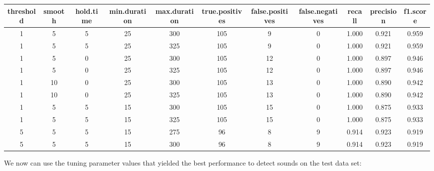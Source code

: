 \documentclass[
]{article}
\newenvironment{Shaded}{\begin{snugshade}}{\end{snugshade}}
\newcommand{\AttributeTok}[1]{\textcolor[rgb]{0.77,0.63,0.00}{#1}}
\newcommand{\DecValTok}[1]{\textcolor[rgb]{0.00,0.00,0.81}{#1}}
\newcommand{\FloatTok}[1]{\textcolor[rgb]{0.00,0.00,0.81}{#1}}
\newcommand{\FunctionTok}[1]{\textcolor[rgb]{0.00,0.00,0.00}{#1}}
\newcommand{\NormalTok}[1]{#1}
\newcommand{\OtherTok}[1]{\textcolor[rgb]{0.56,0.35,0.01}{#1}}
\newcommand{\SpecialCharTok}[1]{\textcolor[rgb]{0.00,0.00,0.00}{#1}}
\begin{document}
\begin{table}
\centering
\begin{tabular}[t]{c|c|c|c|c|c|c|c|c|c|c}
\hline
threshold & smooth & hold.time & min.duration & max.duration & true.positives & false.positives & false.negatives & recall & precision & f1.score\\
\hline
1 & 5 & 5 & 25 & 300 & 105 & 9 & 0 & 1.000 & 0.921 & 0.959\\
\hline
1 & 5 & 5 & 25 & 325 & 105 & 9 & 0 & 1.000 & 0.921 & 0.959\\
\hline
1 & 5 & 0 & 25 & 300 & 105 & 12 & 0 & 1.000 & 0.897 & 0.946\\
\hline
1 & 5 & 0 & 25 & 325 & 105 & 12 & 0 & 1.000 & 0.897 & 0.946\\
\hline
1 & 10 & 0 & 25 & 300 & 105 & 13 & 0 & 1.000 & 0.890 & 0.942\\
\hline
1 & 10 & 0 & 25 & 325 & 105 & 13 & 0 & 1.000 & 0.890 & 0.942\\
\hline
1 & 5 & 5 & 15 & 300 & 105 & 15 & 0 & 1.000 & 0.875 & 0.933\\
\hline
1 & 5 & 5 & 15 & 325 & 105 & 15 & 0 & 1.000 & 0.875 & 0.933\\
\hline
5 & 5 & 5 & 15 & 275 & 96 & 8 & 9 & 0.914 & 0.923 & 0.919\\
\hline
5 & 5 & 5 & 15 & 300 & 96 & 8 & 9 & 0.914 & 0.923 & 0.919\\
\hline
\end{tabular}
\end{table}

We now can use the tuning parameter values that yielded the best
performance to detect sounds on the test data set:

\begin{Shaded}
\end{Shaded}
\end{document}
